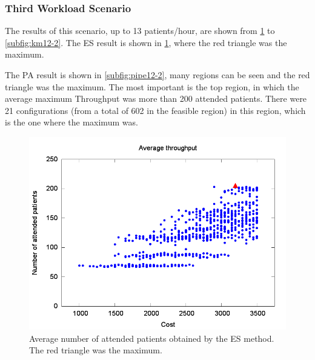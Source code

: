\documentclass[11pt]{article} %
\begin{document}
\subsubsection{Third Workload Scenario}

The results of this scenario, up to 13 patients/hour, are shown from
\ref{subfig:es12-2} to \ref{subfig:km12-2}. The ES result is shown
in \ref{subfig:es12-2}, where the red triangle was the maximum. 

The PA result is shown in \ref{subfig:pipe12-2}, many regions can
be seen and the red triangle was the maximum. The most important is
the top region, in which the average maximum Throughput was more than
200 attended patients. There were 21 configurations (from a total
of 602 in the feasible region) in this region, which is the one where
the maximum was.

\begin{figure}[H]
\centering{}\includegraphics[width=0.95\columnwidth,height=0.25\paperheight]{figs4/v02/6400-602-75-exh-throughput-max}
\caption{Average number of attended patients obtained by the ES method. The
red triangle was the maximum. \label{subfig:es12-2}}
\end{figure}
 
\end{document}
